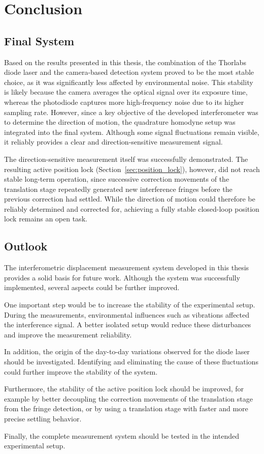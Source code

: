 \chapter{Conclusion}
\thispagestyle{empty}

\section{Final System}

Based on the results presented in this thesis, the combination of the Thorlabs diode laser and the camera-based detection system proved to be the most stable choice, as it was significantly less affected by environmental noise. This stability is likely because the camera averages the optical signal over its exposure time, whereas the photodiode captures more high-frequency noise due to its higher sampling rate. However, since a key objective of the developed interferometer was to determine the direction of motion, the quadrature homodyne setup was integrated into the final system. Although some signal fluctuations remain visible, it reliably provides a clear and direction-sensitive measurement signal.

The direction-sensitive measurement itself was successfully demonstrated. The resulting active position lock (Section~\ref{sec:position_lock}), however, did not reach stable long-term operation, since successive correction movements of the translation stage repeatedly generated new interference fringes before the previous correction had settled. While the direction of motion could therefore be reliably determined and corrected for, achieving a fully stable closed-loop position lock remains an open task.


\section{Outlook}

The interferometric displacement measurement system developed in this thesis provides a solid basis for future work. Although the system was successfully implemented, several aspects could be further improved.

One important step would be to increase the stability of the experimental setup. During the measurements, environmental influences such as vibrations affected the interference signal. A better isolated setup would reduce these disturbances and improve the measurement reliability.

In addition, the origin of the day-to-day variations observed for the diode laser should be investigated. Identifying and eliminating the cause of these fluctuations could further improve the stability of the system.

Furthermore, the stability of the active position lock should be improved, for example by better decoupling the correction movements of the translation stage from the fringe detection, or by using a translation stage with faster and more precise settling behavior.

Finally, the complete measurement system should be tested in the intended experimental setup.


